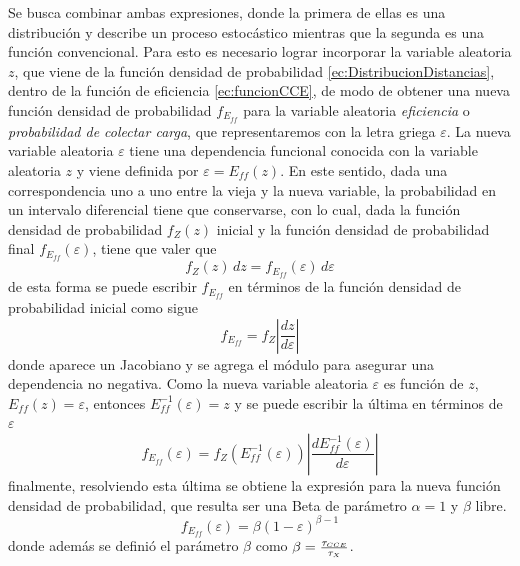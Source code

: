 Se busca combinar ambas expresiones, donde la primera de ellas es una distribución y describe un proceso estocástico mientras que la segunda es una función convencional. Para esto es necesario lograr incorporar la variable aleatoria $z$, que viene de la función densidad de probabilidad \ref{ec:DistribucionDistancias}, dentro de la función de eficiencia \ref{ec:funcionCCE}, de modo de obtener una nueva función densidad de probabilidad $f_{E_{ff}}$ para la variable aleatoria \textit{eficiencia} o \textit{probabilidad de colectar carga}, que representaremos con la letra griega $\varepsilon$. La nueva variable aleatoria $\varepsilon$ tiene una dependencia funcional conocida con la variable aleatoria $z$ y viene definida por $\varepsilon = E_{ff}(z)$. En este sentido, dada una correspondencia uno a uno entre la vieja y la nueva variable, la probabilidad en un intervalo diferencial tiene que conservarse, con lo cual, dada la función densidad de probabilidad $f_{Z}(z)$ inicial y la función densidad de probabilidad final $f_{E_{ff}}(\varepsilon)$, tiene que valer que
\begin{equation*}
    f_{Z}(z)\,dz = f_{E_{ff}}(\varepsilon)\,d\varepsilon
\end{equation*}
de esta forma se puede escribir $f_{E_{ff}}$ en términos de la función densidad de probabilidad inicial como sigue
\begin{equation*}
    f_{E_{ff}} 
    = f_{Z}
    \left|
        \frac{dz}{d\varepsilon}
    \right|
\end{equation*}
donde aparece un Jacobiano y se agrega el módulo para asegurar una dependencia no negativa. Como la nueva variable aleatoria $\varepsilon$ es función de $z$, $E_{ff}(z) = \varepsilon$, entonces $E_{ff}^{-1}(\varepsilon) = z$ y se puede escribir la última en términos de $\varepsilon$
\begin{equation*}
    f_{E_{ff}}(\varepsilon) 
    = f_{Z}
    \left(
        E_{ff}^{-1}(\varepsilon)
    \right)
    \left|
        \frac{dE_{ff}^{-1}(\varepsilon)}{d\varepsilon}
    \right|
\end{equation*}
finalmente, resolviendo esta última se obtiene la expresión para la nueva función densidad de probabilidad, que resulta ser una Beta de parámetro $\alpha = 1$ y $\beta$ libre.
\begin{equation*}
    f_{E_{ff}}(\varepsilon) = \beta (1 - \varepsilon)^{\beta - 1}
\end{equation*}
donde además se definió el parámetro $\beta$ como $\beta = \frac{\tau_{\scaleto{CCE}{3pt}}}{\tau_{\scaleto{X}{3pt}}}$. 
